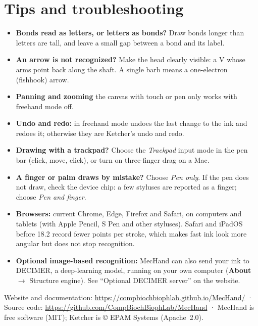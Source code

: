 \documentclass[11pt,a4paper]{article}
\newcommand{\key}[1]{\fbox{\footnotesize\ttfamily #1}}
\newcommand{\btn}[1]{\textsf{\textbf{#1}}}
\begin{document}
\section{Tips and troubleshooting}

\begin{itemize}[leftmargin=*]
  \item \textbf{Bonds read as letters, or letters as bonds?} Draw bonds longer than letters are tall,
    and leave a small gap between a bond and its label.
  \item \textbf{An arrow is not recognized?} Make the head clearly visible: a V whose arms point back
    along the shaft. A single barb means a one-electron (fishhook) arrow.
  \item \textbf{Panning and zooming} the canvas with touch or pen only works with freehand mode off.
  \item \textbf{Undo and redo:} in freehand mode \key{Ctrl/Cmd Z} undoes the last change to the ink
    and \key{Ctrl/Cmd Shift Z} redoes it; otherwise they are Ketcher's undo and redo.
  \item \textbf{Drawing with a trackpad?} Choose the \emph{Trackpad} input mode in the pen bar
    (click, move, click), or turn on three-finger drag on a Mac.
  \item \textbf{A finger or palm draws by mistake?} Choose \emph{Pen only}. If the pen does not
    draw, check the device chip: a few styluses are reported as a finger; choose \emph{Pen and finger}.
  \item \textbf{Browsers:} current Chrome, Edge, Firefox and Safari, on computers and tablets (with
    Apple Pencil, S Pen and other styluses). Safari and iPadOS before 18.2 record fewer points per
    stroke, which makes fast ink look more angular but does not stop recognition.
  \item \textbf{Optional image-based recognition:} MecHand can also send your ink to DECIMER, a deep-learning
    model, running on your own computer (\btn{About} $\rightarrow$ Structure engine). See ``Optional
    DECIMER server'' on the website.
\end{itemize}

\vfill
\noindent\small Website and documentation: \url{https://compbiochbiophlab.github.io/MecHand/} ·
Source code: \url{https://github.com/CompBiochBiophLab/MecHand} · MecHand is free software (MIT);
Ketcher is © EPAM Systems (Apache~2.0).
\end{document}
